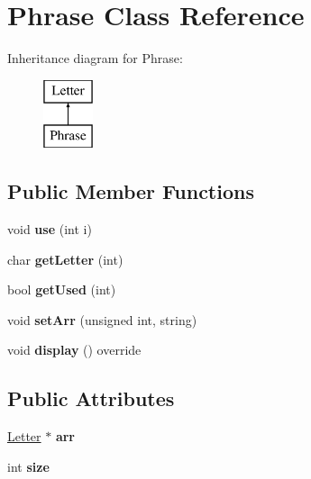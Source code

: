 \hypertarget{class_phrase}{}\section{Phrase Class Reference}
\label{class_phrase}
Inheritance diagram for Phrase\+:\begin{figure}[H]
\begin{center}
\leavevmode
\includegraphics[height=2.000000cm]{class_phrase}
\end{center}
\end{figure}
\subsection*{Public Member Functions}
\begin{DoxyCompactItemize}
\item 
\hypertarget{class_phrase_aad8eb600a46aa1ffc25d7e0cb832f39b}{}\label{class_phrase_aad8eb600a46aa1ffc25d7e0cb832f39b} 
void {\bfseries use} (int i)
\item 
\hypertarget{class_phrase_a37e468274bd22c24e4cd1b76da578a72}{}\label{class_phrase_a37e468274bd22c24e4cd1b76da578a72} 
char {\bfseries get\+Letter} (int)
\item 
\hypertarget{class_phrase_a6144cc3eeb1f836b17e3d5f27d8eeec4}{}\label{class_phrase_a6144cc3eeb1f836b17e3d5f27d8eeec4} 
bool {\bfseries get\+Used} (int)
\item 
\hypertarget{class_phrase_ac673baf27de8946062e8f7846d2eb35c}{}\label{class_phrase_ac673baf27de8946062e8f7846d2eb35c} 
void {\bfseries set\+Arr} (unsigned int, string)
\item 
\hypertarget{class_phrase_a5913994bf6d88d27010ea27c7ed5a9ff}{}\label{class_phrase_a5913994bf6d88d27010ea27c7ed5a9ff} 
void {\bfseries display} () override
\end{DoxyCompactItemize}
\subsection*{Public Attributes}
\begin{DoxyCompactItemize}
\item 
\hypertarget{class_phrase_a4b3197553bd2ee003405e00284582115}{}\label{class_phrase_a4b3197553bd2ee003405e00284582115} 
\hyperlink{class_letter}{Letter} $\ast$ {\bfseries arr}
\item 
\hypertarget{class_phrase_a56e47c200f6575fdbcad8e9708c5c23c}{}\label{class_phrase_a56e47c200f6575fdbcad8e9708c5c23c} 
int {\bfseries size}
\end{DoxyCompactItemize}
